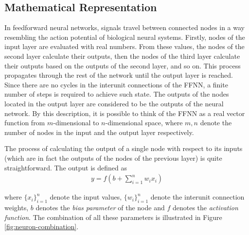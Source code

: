 \subsection{Mathematical Representation}
In feedforward neural networks, signals travel between connected nodes in a way resembling the action potential of biological neural systems. Firstly, nodes of the input layer are evaluated with real numbers. From these values, the nodes of the second layer calculate their outputs, then the nodes of the third layer calculate their outputs based on the outputs of the second layer, and so on. This process propagates through the rest of the network until the output layer is reached. Since there are no cycles in the interunit connections of the FFNN, a finite number of steps is required to achieve such state. The outputs of the nodes located in the output layer are considered to be the outputs of the neural network. By this description, it is possible to think of the FFNN as a real vector function from $m$-dimensional to $n$-dimensional space, where $m,n$ denote the number of nodes in the input and the output layer respectively.

The process of calculating the output of a single node with respect to its inputs (which are in fact the outputs of the nodes of the previous layer) is quite straightforward. The output is defined as
~
\begin{align}
	y = f\left(b+\sum_{i=1}^n w_i x_i\right)
\end{align}

\noindent
where $\{x_i\}_{i=1}^n$ denote the input values, $\{w_i\}_{i=1}^n$ denote the interunit connection weights, $b$ denotes the \textit{bias parameter} of the node and $f$ denotes the \textit{activation function}. The combination of all these parameters is illustrated in Figure \ref{fig:neuron-combination}.

